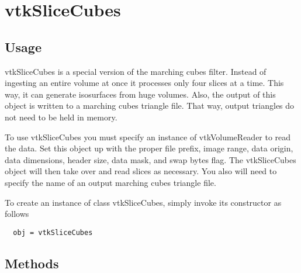 \section{vtkSliceCubes}

\subsection{Usage}

 vtkSliceCubes is a special version of the marching cubes filter. Instead
 of ingesting an entire volume at once it processes only four slices at
 a time. This way, it can generate isosurfaces from huge volumes. Also, the 
 output of this object is written to a marching cubes triangle file. That
 way, output triangles do not need to be held in memory.
 
 To use vtkSliceCubes you must specify an instance of vtkVolumeReader to
 read the data. Set this object up with the proper file prefix, image range,
 data origin, data dimensions, header size, data mask, and swap bytes flag. 
 The vtkSliceCubes object will then take over and read slices as necessary. 
 You also will need to specify the name of an output marching cubes triangle 
 file.


To create an instance of class vtkSliceCubes, simply
invoke its constructor as follows
\begin{verbatim}
  obj = vtkSliceCubes
\end{verbatim}
\subsection{Methods}

